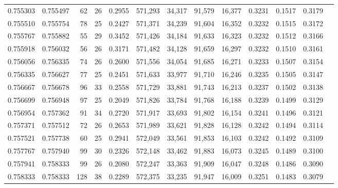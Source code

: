 \begin{tabular}{rrrrrrrrrrrrr}
0.755303 & 0.755497 &     62 &    26 &                                     0.2955 & 571,293 &  34,317 &  91,579 &  16,377 & 0.3231 & 0.1517 & 0.3179 \\
0.755510 & 0.755754 &     78 &    25 &                                     0.2427 & 571,371 &  34,239 &  91,604 &  16,352 & 0.3232 & 0.1515 & 0.3172 \\
0.755767 & 0.755882 &     55 &    29 &                                     0.3452 & 571,426 &  34,184 &  91,633 &  16,323 & 0.3232 & 0.1512 & 0.3166 \\
0.755918 & 0.756032 &     56 &    26 &                                     0.3171 & 571,482 &  34,128 &  91,659 &  16,297 & 0.3232 & 0.1510 & 0.3161 \\
0.756056 & 0.756335 &     74 &    26 &                                     0.2600 & 571,556 &  34,054 &  91,685 &  16,271 & 0.3233 & 0.1507 & 0.3154 \\
0.756335 & 0.756627 &     77 &    25 &                                     0.2451 & 571,633 &  33,977 &  91,710 &  16,246 & 0.3235 & 0.1505 & 0.3147 \\
0.756667 & 0.756678 &     96 &    33 &                                     0.2558 & 571,729 &  33,881 &  91,743 &  16,213 & 0.3237 & 0.1502 & 0.3138 \\
0.756699 & 0.756948 &     97 &    25 &                                     0.2049 & 571,826 &  33,784 &  91,768 &  16,188 & 0.3239 & 0.1499 & 0.3129 \\
0.756954 & 0.757362 &     91 &    34 &                                     0.2720 & 571,917 &  33,693 &  91,802 &  16,154 & 0.3241 & 0.1496 & 0.3121 \\
0.757371 & 0.757512 &     72 &    26 &                                     0.2653 & 571,989 &  33,621 &  91,828 &  16,128 & 0.3242 & 0.1494 & 0.3114 \\
0.757521 & 0.757738 &     60 &    25 &                                     0.2941 & 572,049 &  33,561 &  91,853 &  16,103 & 0.3242 & 0.1492 & 0.3109 \\
0.757767 & 0.757940 &     99 &    30 &                                     0.2326 & 572,148 &  33,462 &  91,883 &  16,073 & 0.3245 & 0.1489 & 0.3100 \\
0.757941 & 0.758333 &     99 &    26 &                                     0.2080 & 572,247 &  33,363 &  91,909 &  16,047 & 0.3248 & 0.1486 & 0.3090 \\
0.758333 & 0.758333 &    128 &    38 &                                     0.2289 & 572,375 &  33,235 &  91,947 &  16,009 & 0.3251 & 0.1483 & 0.3079 \\

\end{tabular}
